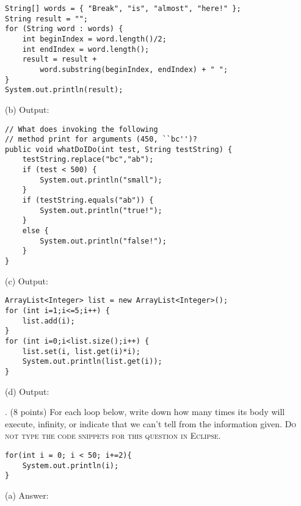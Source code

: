 \documentclass[12pt,twoside]{article}
\newcommand{\fillInBlank}[1][0.5in]{\underline{\hspace{#1}}}
\begin{document}
\vfill
\hfill
\begin{minipage}{0.60\linewidth}
\begin{lstlisting}
String[] words = { "Break", "is", "almost", "here!" };
String result = "";
for (String word : words) {
	int beginIndex = word.length()/2;
	int endIndex = word.length();
	result = result + 
		word.substring(beginIndex, endIndex) + " ";
}
System.out.println(result);
\end{lstlisting}
\end{minipage}
\hspace{0.25in}
(b) Output: \fillInBlank[1in]

\vfill
\hfill

\begin{minipage}{0.60\linewidth}
\begin{lstlisting}
// What does invoking the following 
// method print for arguments (450, ``bc'')?
public void whatDoIDo(int test, String testString) {
	testString.replace("bc","ab");
	if (test < 500) {
		System.out.println("small");
	}
	if (testString.equals("ab")) {
		System.out.println("true!");
	}
	else {
		System.out.println("false!");
	}	
}
\end{lstlisting}
\end{minipage}
\hspace{0.25in}
\begin{minipage}{0.3\linewidth}
(c) Output: \fillInBlank[1in]

\vspace{0.25in}

\end{minipage}
\vfill
\hfill
\begin{minipage}{0.60\linewidth}
\begin{lstlisting}
ArrayList<Integer> list = new ArrayList<Integer>();
for (int i=1;i<=5;i++) {
	list.add(i);
}
for (int i=0;i<list.size();i++) {
	list.set(i, list.get(i)*i);
	System.out.println(list.get(i));
}
\end{lstlisting}
\end{minipage}
\hspace{0.25in}
(d) Output: \fillInBlank[1in]
\vfill


. (8 points) For each loop below, write down how many times its body will execute, infinity, or indicate that we can't tell from the information given. \textsc{Do not type the code snippets for this question in Eclipse}.
\vspace{0.25in}

\hfill
\begin{minipage}{0.58\linewidth}
\begin{lstlisting}
for(int i = 0; i < 50; i+=2){
	System.out.println(i);
}
\end{lstlisting}
\end{minipage}
\hspace{0.25in}
\begin{minipage}[t]{0.25\linewidth}
(a) Answer: \fillInBlank
\end{minipage}
\vfill
\end{document}

